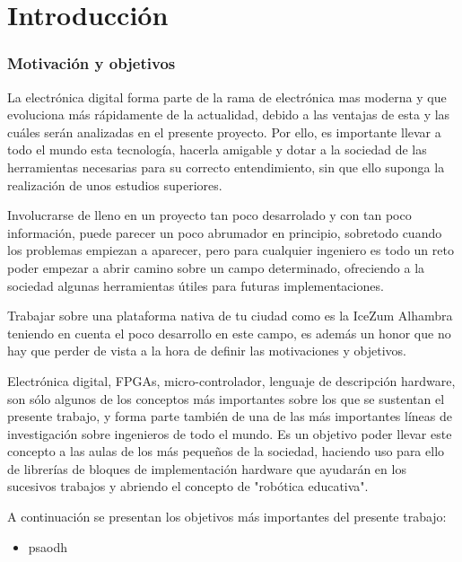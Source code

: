 \chapter{Introducción}\label{sec:intro}
\subsection{Motivación y objetivos}
La electrónica digital forma parte de la rama de electrónica mas moderna y que evoluciona más rápidamente de la actualidad, debido a las ventajas de esta y las cuáles serán analizadas en el presente proyecto. Por ello, es importante llevar a todo el mundo esta tecnología, hacerla amigable y dotar a la sociedad de las herramientas necesarias para su correcto entendimiento, sin que ello suponga la realización de unos estudios superiores. \newline

Involucrarse de lleno en un proyecto tan poco desarrolado y con tan poco información, puede parecer un poco abrumador en principio, sobretodo cuando los problemas empiezan a aparecer, pero para cualquier ingeniero es todo un reto poder empezar a abrir camino sobre un campo determinado, ofreciendo a la sociedad algunas herramientas útiles para futuras implementaciones. \newline

Trabajar sobre una plataforma nativa de tu ciudad como es la IceZum Alhambra teniendo en cuenta el poco desarrollo en este campo, es además un honor que no hay que perder de vista a la hora de definir las motivaciones y objetivos. \newline

Electrónica digital, FPGAs, micro-controlador, lenguaje de descripción hardware, son sólo algunos de los conceptos más importantes sobre los que se sustentan el presente trabajo, y forma parte también de una de las más importantes líneas de investigación sobre ingenieros de todo el mundo. Es un objetivo poder llevar este concepto a las aulas de los más pequeños de la sociedad, haciendo uso para ello de librerías de bloques de implementación hardware que ayudarán en los sucesivos trabajos y abriendo el concepto de "robótica educativa". \newline

A continuación se presentan los objetivos más importantes del presente trabajo:
\begin{itemize}
	\item psaodh
\end{itemize}

